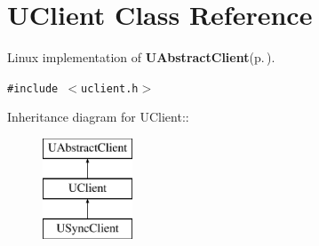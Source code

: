 \section{UClient Class Reference}
\label{classUClient}
Linux implementation of {\bf UAbstract\-Client}{\rm (p.\,\pageref{classUAbstractClient})}.  


{\tt \#include $<$uclient.h$>$}

Inheritance diagram for UClient::\begin{figure}[H]
\begin{center}
\leavevmode
\includegraphics[height=3cm]{classUClient}
\end{center}
\end{figure}

